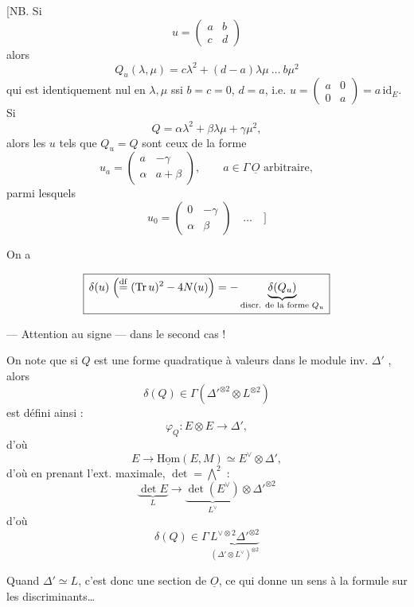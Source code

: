 \documentclass[11pt,a4paper]{article}
\begin{document}
[NB. Si
\[
  u = \begin{pmatrix} a & b \\ c & d \end{pmatrix}
\]
alors
\[
  Q_u(\lambda, \mu) = c\lambda^2 + (d - a)\lambda\mu \ \ldots\ b\mu^2
\]
qui est identiquement nul en $\lambda, \mu$ ssi $b = c = 0$, $d = a$, i.e. $u = \begin{pmatrix} a & 0 \\ 0 & a \end{pmatrix} = a\,\mathrm{id}_E$.
Si
\[
  Q = \alpha\lambda^2 + \beta\lambda\mu + \gamma\mu^2 ,
\]
alors les $u$ tels que $Q_u = Q$ sont ceux de la forme
\[
  u_a = \begin{pmatrix} a & -\gamma \\ \alpha & a + \beta \end{pmatrix}, \qquad a \in \Gamma\,\underline{O} \text{ arbitraire},
\]
parmi lesquels
\[
  u_0 = \begin{pmatrix} 0 & -\gamma \\ \alpha & \beta \end{pmatrix} \quad \ldots \quad ]
\]

On a 

\[
  \boxed{\,\delta(u) \;\Bigl(\overset{\mathrm{df}}{=} (\mathrm{Tr}\,u)^2 - 4N(u)\Bigr) = -\underbrace{\delta(Q_u)}_{\text{discr. de la forme } Q_u}\,}
\]

— Attention au signe — dans le second cas !

On note que si $Q$ est une forme quadratique à valeurs dans le module inv. $\Delta'$  , alors
\[
  \delta(Q) \in \Gamma(\Delta'^{\otimes 2} \otimes L^{\otimes 2})
\]
est défini ainsi :
\[
  \varphi_Q : E \otimes E \longrightarrow \Delta' ,
\]
d'où
\[
  E \longrightarrow \underline{\mathrm{Hom}}(E, M) \simeq E^\vee \otimes \Delta' ,
\]
d'où \struck{\ill{}} en prenant l'ext.   maximale, $\det = \bigwedge^2$ :
\[
  \underbrace{\det E}_{L} \longrightarrow \underbrace{\det(E^\vee)}_{L^\vee} \otimes \Delta'^{\otimes 2}
\]
d'où
\[
  \delta(Q) \in \Gamma\, \underbrace{L^{\vee \otimes 2} \Delta'^{\otimes 2}}_{(\Delta' \otimes L^\vee)^{\otimes 2}}
\]

 Quand $\Delta' \simeq L$, c'est donc une section de $\underline{O}$, ce qui donne un sens à la formule sur les discriminants…
\end{document}
